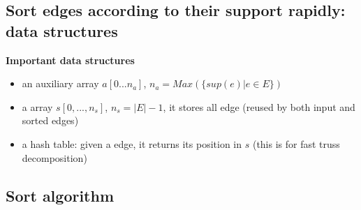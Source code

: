 \documentclass{beamer}
\begin{document}
\subsection{Sort edges according to their support rapidly: data structures}
\begin{frame}
	\textbf{Important data structures}
	\begin{itemize}
		\item  an auxiliary array $a[0...n_{a}]$, $n_{a}= Max(\{sup(e)|e\in E\})$
		\item  a array $s[0,...,n_{s}]$, $n_{s}=|E|-1$, it stores all edge (reused by both input and sorted edges)
		\item  a hash table: given a edge, it returns its position in $s$ (this is for fast truss decomposition)
	\end{itemize}
\end{frame}


\subsection{Sort algorithm}
\begin{frame}
\end{frame}
\end{document}
